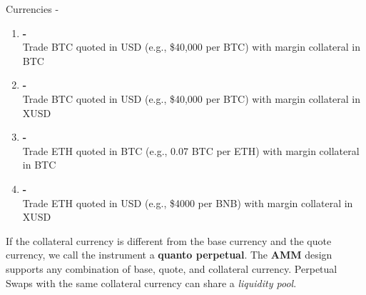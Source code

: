\documentclass[10pt,a4paper]{article}
\begin{document}
\begin{multicols}{3}
\begin{textbox}{Currencies}
	{-}\\
	\textbf{\color{red}{The position size is denoted in Base Currency.}} 
	\textbf{\color{mygreen}{The price of the perpetual per unit of base currency is quoted
	in Quote Currency}} 	
	\textbf{\color{blue}{The trader margin is deposited in collateral currency. Profit and
	loss are paid in collateral currency.}} 
	\begin{enumerate}
	    \item \textbf{\color{red}{BTC}\color{mygreen}{USD} - \color{blue}{BTC}} \\
	    Trade BTC quoted in USD (e.g., \$40,000 per BTC) with margin collateral in BTC
	    \item \textbf{\color{red}{BTC}\color{mygreen}{XUSD} - \color{blue}{XUSD}} \\
	    Trade BTC quoted in USD (e.g., \$40,000 per BTC) with margin collateral in XUSD
	    \item \textbf{\color{red}{ETH}\color{mygreen}{BTC} - \color{blue}{BTC}} \\
	    Trade ETH quoted in BTC (e.g., 0.07 BTC per ETH) with margin collateral in BTC
	     \item \textbf{\color{red}{ETH}\color{mygreen}{USD} - \color{blue}{BTC}} \\
	    Trade ETH quoted in USD (e.g., \$4000 per BNB) with margin collateral in XUSD
	\end{enumerate}
	If the collateral currency is different from the 
	base currency and the quote currency, we call the instrument a \textbf{quanto perpetual}.
	The \textbf{AMM} design supports any combination of base, quote, and collateral currency.
	Perpetual Swaps with the same collateral currency can share a \emph{liquidity pool}.
\end{textbox}


\end{multicols}
\end{document}
